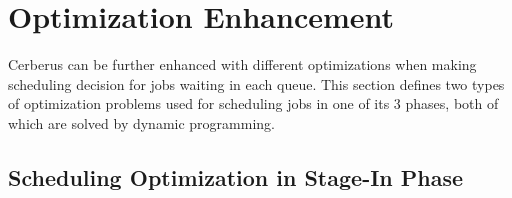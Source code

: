 % 


\section{Optimization Enhancement}
\label{Sec:Opt}

Cerberus can be further enhanced with different optimizations when making scheduling decision
for jobs waiting in each queue.
This section defines two types of optimization problems used for scheduling jobs in one of its 3 phases,
both of which are solved by dynamic programming.

\subsection{Scheduling Optimization in Stage-In Phase}

